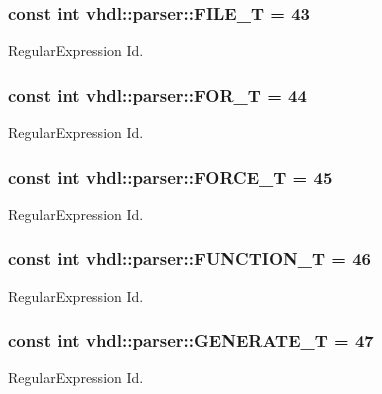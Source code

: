 \subsubsection[{F\+I\+L\+E\+\_\+\+T}]{\setlength{\rightskip}{0pt plus 5cm}const int vhdl\+::parser\+::\+F\+I\+L\+E\+\_\+\+T = 43}\label{namespacevhdl_1_1parser_a4e3358f772b1d0b0c54f8b2863e5008c}
Regular\+Expression Id. \hypertarget{namespacevhdl_1_1parser_a0dddd6fbcd078b6f856614f806d3077a}{}
\subsubsection[{F\+O\+R\+\_\+\+T}]{\setlength{\rightskip}{0pt plus 5cm}const int vhdl\+::parser\+::\+F\+O\+R\+\_\+\+T = 44}\label{namespacevhdl_1_1parser_a0dddd6fbcd078b6f856614f806d3077a}
Regular\+Expression Id. \hypertarget{namespacevhdl_1_1parser_a48285f9db7442d768cc10f169b508b3f}{}
\subsubsection[{F\+O\+R\+C\+E\+\_\+\+T}]{\setlength{\rightskip}{0pt plus 5cm}const int vhdl\+::parser\+::\+F\+O\+R\+C\+E\+\_\+\+T = 45}\label{namespacevhdl_1_1parser_a48285f9db7442d768cc10f169b508b3f}
Regular\+Expression Id. \hypertarget{namespacevhdl_1_1parser_aff496e09b39cca0c5dd0cbb65bb65f66}{}
\subsubsection[{F\+U\+N\+C\+T\+I\+O\+N\+\_\+\+T}]{\setlength{\rightskip}{0pt plus 5cm}const int vhdl\+::parser\+::\+F\+U\+N\+C\+T\+I\+O\+N\+\_\+\+T = 46}\label{namespacevhdl_1_1parser_aff496e09b39cca0c5dd0cbb65bb65f66}
Regular\+Expression Id. \hypertarget{namespacevhdl_1_1parser_a7fe3af6b8878d4022abec11a9574b6b2}{}
\subsubsection[{G\+E\+N\+E\+R\+A\+T\+E\+\_\+\+T}]{\setlength{\rightskip}{0pt plus 5cm}const int vhdl\+::parser\+::\+G\+E\+N\+E\+R\+A\+T\+E\+\_\+\+T = 47}\label{namespacevhdl_1_1parser_a7fe3af6b8878d4022abec11a9574b6b2}
Regular\+Expression Id. \hypertarget{namespacevhdl_1_1parser_a35936c8a9c66fe087114a4b18bf81c60}{}
